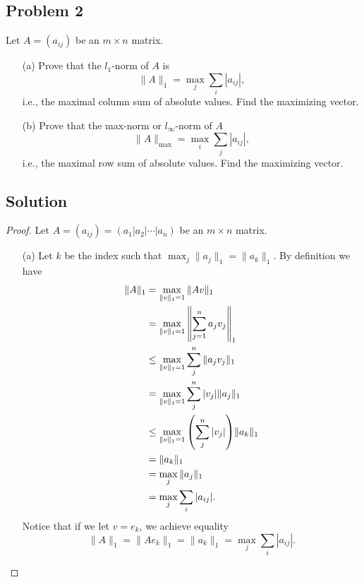 \documentclass[12pt]{report}
\begin{document}


\begin{problem}%
\subsection*{Problem 2}

Let $A = (a_{ij})$ be an $m \times n$ matrix.

\begin{enumerate}
    \item [(a)] Prove that the $l_1$-norm of $A$ is
    \[
        \| A \|_1 = \max_j \sum_i |a_{ij}|,
    \]
    i.e., the maximal column sum of absolute values. Find the maximizing vector.
    \item [(b)] Prove that the max-norm or $l_\infty$-norm of $A$
    \[
        \| A \|_{\max} = \max_i \sum_j |a_{ij}|,
    \]
    i.e., the maximal row sum of absolute values. Find the maximizing vector.
\end{enumerate}

\subsection*{Solution}
\begin{proof}

Let $A = (a_{ij}) = (a_1 | a_2 | \cdots | a_n)$ be an $m \times n$ matrix. 
\begin{enumerate}
    \item [(a)]
    Let $k$ be the index such that $\max_{j} \| a_j \|_1 = \|a_{k}\|_1$. By definition we have
    \begin{align*}
        \|A\|_1 &=  \max_{\|v\|_1 = 1}\| Av \|_1\\
                &=  \max_{\|v\|_1 = 1}\left\| \sum_{j=1}^n a_{j}v_j \right\|_1\\
                &\leq \max_{\|v\|_1 = 1}\sum_j^n \|a_j v_j \|_1\\ 
                &=\max_{\|v\|_1 = 1} \sum_j^n |v_j| \| a_j\|_1\\
                &\leq \max_{\|v\|_1 = 1} {\left(\sum_j^n |v_j|\right)} \|a_{k}\|_1\\
                &= \| a_k \|_1\\
                &= \max_j \| a_j \|_1\\
                &= \max_j \sum_i |a_{ij}|.
    \end{align*}
    Notice that if we let $v = e_k$, we achieve equality  
    \[
        \|A\|_1 = \|A e_k\|_1 = \|a_k\|_1 = \max_{j}\sum_i |a_{ij}|.
    \]



\end{enumerate}
\end{proof}
\end{problem}
\end{document}
